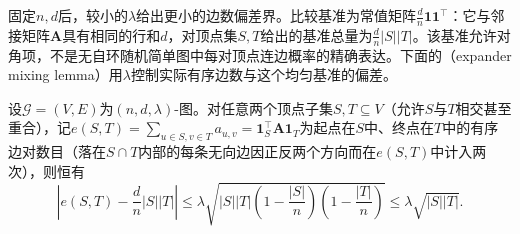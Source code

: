 固定$n,d$后，较小的$\lambda$给出更小的边数偏差界。比较基准为常值矩阵$\frac dn\bm1\bm1^\top$：它与邻接矩阵$\bm A$具有相同的行和$d$，对顶点集$S,T$给出的基准总量为$\frac dn|S||T|$。该基准允许对角项，不是无自环随机简单图中每对顶点连边概率的精确表达。下面的（expander mixing lemma）用$\lambda$控制实际有序边数与这个均匀基准的偏差。

\begin{theorem}
\label{thm:graph-expander-mixing}
设$\mathcal G=(V,E)$为$(n,d,\lambda)$-图。对任意两个顶点子集$S,T\subseteq V$（允许$S$与$T$相交甚至重合），记$e(S,T)=\sum_{u\in S,v\in T}a_{u,v}=\bm 1_S^\top\bm A\bm 1_T$为起点在$S$中、终点在$T$中的有序边对数目（落在$S\cap T$内部的每条无向边因正反两个方向而在$e(S,T)$中计入两次），则恒有
\begin{equation}
\label{eq:graph-expander-mixing}
\left|e(S,T)-\frac{d}{n}|S||T|\right|
\le \lambda\sqrt{|S||T|\left(1-\frac{|S|}{n}\right)\left(1-\frac{|T|}{n}\right)}
\le \lambda\sqrt{|S||T|}.
\end{equation}
\end{theorem}

